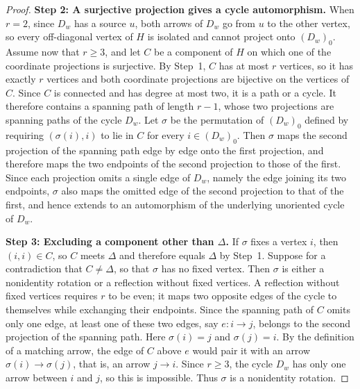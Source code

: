 \documentclass[a4paper,reqno,10pt]{amsart}
\theoremstyle{definition}
\numberwithin{equation}{section}
\begin{document}
\begin{proof}
\noindent\textbf{Step 2: A surjective projection gives a cycle automorphism.}
When $r=2$, since $D_w$ has a source $u$, both arrows of $D_w$ go from $u$ to the other vertex, so every off-diagonal
vertex of $H$ is isolated and cannot project onto $(D_w)_0$. Assume now that $r\ge3$, and let $C$ be a component of $H$ on which one of the coordinate projections is surjective. By Step~1, $C$ has at most $r$ vertices, so it has exactly $r$ vertices and both coordinate projections are bijective on the vertices of $C$.
Since $C$ is connected and has degree at most two, it is a path or a
cycle. It therefore contains a spanning path of length $r-1$, whose two projections are spanning paths
of the cycle $D_w$. Let $\sigma$ be the permutation of $(D_w)_0$ defined by requiring
$(\sigma(i),i)$ to lie in $C$ for every $i\in(D_w)_0$. Then $\sigma$ maps the second
projection of the spanning path edge by edge onto the first projection,
and therefore maps the two endpoints of the second projection to those of the first.
Since each projection omits a single edge of $D_w$, namely the edge joining
its two endpoints, $\sigma$ also maps the omitted edge of the second
projection to that of the first, and hence extends to an
automorphism of the underlying unoriented cycle of $D_w$.

\noindent\textbf{Step 3: Excluding a component other than $\Delta$.}
If $\sigma$ fixes a vertex $i$, then $(i,i)\in C$, so $C$ meets $\Delta$ and therefore equals $\Delta$ by Step~1.
Suppose for a contradiction that $C\ne\Delta$, so that $\sigma$ has no fixed vertex. Then $\sigma$ is either a nonidentity rotation or a reflection without fixed
vertices. A reflection without fixed vertices requires $r$ to be even;
it maps two opposite edges of the cycle to themselves while exchanging
their endpoints. Since the spanning path of $C$ omits only one edge, at least
one of these two edges, say $e:i\to j$, belongs to the second projection
of the spanning path. Here $\sigma(i)=j$ and $\sigma(j)=i$. By the
definition of a matching arrow, the edge of $C$ above $e$ would pair it
with an arrow $\sigma(i)\to\sigma(j)$, that is, an arrow $j\to i$. Since $r\ge3$, the cycle $D_w$ has only one arrow between $i$ and
$j$, so this is impossible.
Thus $\sigma$ is a nonidentity rotation.


\end{proof}
\end{document}
